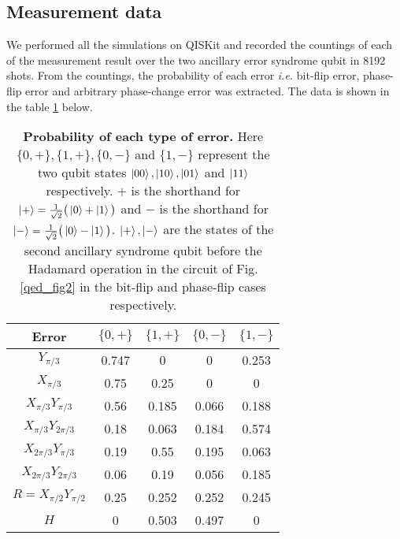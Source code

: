 \documentclass[superscriptaddress,twocolumn,showpacs,prb]{revtex4-1}
\begin{document}
\subsection{Measurement data}
We performed all the simulations on QISKit and recorded the countings of each of the measurement result over the two ancillary error syndrome qubit in 8192 shots. From the countings, the probability of each error \textit{i.e.} bit-flip error, phase-flip error and arbitrary phase-change error was extracted. The data is shown in the table \ref{qed_table1} below.
\begin{table}[h!]
\begin{center}
 \begin{tabular}{c c c c c} 
 \hline
 \hline
 Error & $\{0 , +\}$ & $\{1 , +\}$&$\{0 , -\}$&$\{1 , -\}$ \\ [0.5ex] 
 \hline
 \hline
 $Y_{\pi/3}$ &0.747 &0 &0&0.253   \\ 
 \hline
 $X_{\pi/3}$ &0.75 &0.25&0&0  \\
 \hline
 $X_{\pi/3}Y_{\pi/3}$ & 0.56&0.185&0.066&0.188\\
 \hline
 $X_{\pi/3}Y_{2\pi/3}$ & 0.18&0.063&0.184&0.574   \\  
\hline
 $X_{2\pi/3}Y_{\pi/3}$ & 0.19&0.55&0.195&0.063   \\ 
 \hline
 $X_{2\pi/3}Y_{2\pi/3}$ & 0.06&0.19&0.056&0.185 \\
 \hline
  $R=X_{\pi/2}Y_{\pi/2}$&0.25&0.252&0.252&0.245\\
  \hline
  $H$&0&0.503&0.497&0\\[1ex] 
 \hline
 \hline
\end{tabular}
\caption{\textbf{Probability of each type of error.} Here $\{0,+\},\{1,+\},\{0,-\}$ and $\{1,-\}$ represent the two qubit states $\Ket{00},\Ket{10},\Ket{01}$ and $\Ket{11}$ respectively. $+$ is the shorthand for $\Ket{+}=\frac{1}{\sqrt{2}}\big(\Ket{0}+\Ket{1}\big)$ and $-$ is the shorthand for $\Ket{-}=\frac{1}{\sqrt{2}}\big(\Ket{0}-\Ket{1}\big)$. $\Ket{+},\Ket{-}$ are the states of the second ancillary syndrome qubit before the Hadamard operation in the circuit of Fig. \ref{qed_fig2} in the bit-flip and phase-flip cases respectively.}
\label{qed_table1}
\end{center}
\end{table}
\end{document}
